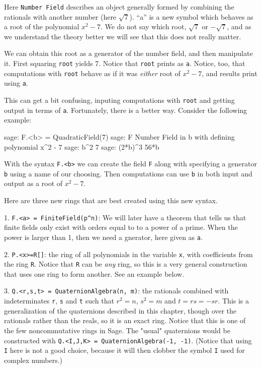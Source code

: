 %
Here \verb?Number Field? describes an object generally formed by combining the rationals with another number (here $\sqrt{7}$).  ``a'' is a new symbol which behaves as a root of the polynomial $x^2-7$.  We do not say which root, $\sqrt{7}$ or $-\sqrt{7}$, and as we understand the theory better we will see that this does not really matter.\par
%
We can obtain this root as a generator of the number field, and then manipulate it.  First squaring \verb?root? yields 7.  Notice that \verb?root? prints as \verb?a?.  Notice, too, that computations with \verb?root? behave as if it was \emph{either} root of $x^2-7$, and results print using \verb?a?.\par
%
This can get a bit confusing, inputing computations with \verb?root? and getting output in terms of \verb?a?.  Fortunately, there is a better way.  Consider the following example:
%
\begin{sageexample}
sage: F.<b> = QuadraticField(7)
sage: F
Number Field in b with defining polynomial x^2 - 7
sage: b^2
7
sage: (2*b)^3
56*b
\end{sageexample}
%
With the syntax \verb?F.<b>? we can create the field \verb?F? along with specifying a generator \verb?b? using a name of our choosing.  Then computations can use \verb?b? in both input and output as a root of $x^2-7$.\par
%
Here are three new rings that are best created using this new syntax.\par
%
1. \verb?F.<a> = FiniteField(p^n)?: We will later have a theorem that tells us that finite fields only exist with orders equal to to a power of a prime.  When the power is larger than 1, then we need a gnerator, here given as \verb?a?.\par
%
2. \verb?P.<x>=R[]?: the ring of all polynomials in the variable \verb?x?, with coefficients from the ring \verb?R?.  Notice that \verb?R? can be \emph{any} ring, so this is a very general construction that uses one ring to form another.  See an example below.\par
%
3. \verb?Q.<r,s,t> = QuaternionAlgebra(n, m)?: the rationals combined with indeterminates \verb?r?, \verb?s? and \verb?t? such that $r^2=n$, $s^2=m$ and $t = rs = -sr$.  This is a generalization of the quaternions described in this chapter, though over the rationals rather than the reals, so it is an exact ring.  Notice that this is one of the few noncommutative rings in Sage.  The "usual" quaternions would be constructed with \verb?Q.<I,J,K> = QuaternionAlgebra(-1, -1)?.  (Notice that using \verb?I? here is not a good choice, because it will then clobber the symbol \verb?I? used for complex numbers.)
